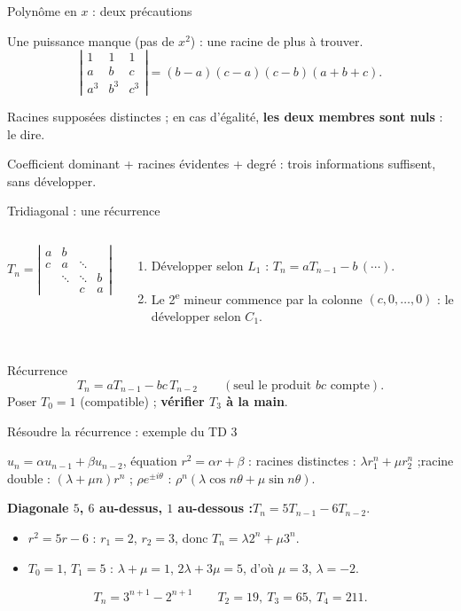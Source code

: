 \documentclass[aspectratio=169,11pt]{beamer}
\newcommand{\dt}[1]{\left|\begin{matrix}#1\end{matrix}\right|}
\begin{document}
\begin{frame}{Polynôme en $x$ : deux précautions}
\begin{PIEGE}
Une puissance manque (pas de $x^2$) : une racine de plus à trouver.
\[\dt{1&1&1\\a&b&c\\a^3&b^3&c^3}=(b-a)(c-a)(c-b)(a+b+c).\]
\end{PIEGE}
\pause
\begin{PIEGE}
Racines supposées distinctes ; en cas d'égalité, \textbf{les deux membres sont nuls} : le dire.
\end{PIEGE}
\pause
\begin{RETENIR}
Coefficient dominant + racines évidentes + degré : trois informations suffisent, sans développer.
\end{RETENIR}
\end{frame}

\begin{frame}{Tridiagonal : une récurrence}
\begin{columns}[c]
\[T_n=\dt{a&b&&\\c&a&\ddots&\\&\ddots&\ddots&b\\&&c&a}\]
\pause
\begin{enumerate}
\item Développer selon $L_1$ : $T_n=aT_{n-1}-b\,(\cdots)$.
\item Le 2\textsuperscript{e} mineur commence par la colonne $(c,0,\dots,0)$ : le développer selon $C_1$.
\end{enumerate}
\end{columns}
\pause
\begin{METH}{Récurrence}
\[T_n=aT_{n-1}-bc\,T_{n-2}\qquad(\text{seul le produit }bc\text{ compte}).\]
Poser $T_0=1$ (compatible) ; \textbf{vérifier $T_3$ à la main}.
\end{METH}
\end{frame}

\begin{frame}{Résoudre la récurrence : exemple du TD 3}
\begin{FORM}
$u_n=\alpha u_{n-1}+\beta u_{n-2}$, équation $r^2=\alpha r+\beta$ :\quad
racines distinctes : $\lambda r_1^n+\mu r_2^n$ ;\quad racine double : $(\lambda+\mu n)r^n$ ;\quad
$\rho e^{\pm i\theta}$ : $\rho^n(\lambda\cos n\theta+\mu\sin n\theta)$.
\end{FORM}
\pause
\textbf{Diagonale $5$, $6$ au-dessus, $1$ au-dessous :}\quad $T_n=5T_{n-1}-6T_{n-2}$.
\pause
\begin{itemize}
\item $r^2=5r-6$ : $r_1=2$, $r_2=3$, donc $T_n=\lambda2^n+\mu3^n$.
\item $T_0=1$, $T_1=5$ : $\lambda+\mu=1$, $2\lambda+3\mu=5$, d'où $\mu=3$, $\lambda=-2$.
\end{itemize}
\pause
\[\boxed{T_n=3^{n+1}-2^{n+1}}\qquad T_2=19,\ T_3=65,\ T_4=211.\]
\end{frame}
\end{document}
